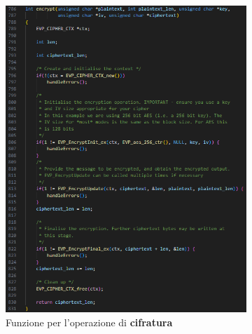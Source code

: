 \begin{figure}[h]
    \begin{subfigure}{0.49\textwidth}
        \includegraphics[width=1\textwidth]{capitoli/figure-implementazione/aes-encrypt.png}
        \caption{Funzione per l'operazione di \textbf{cifratura}}
        \label{fig:aes-encrypt}
    \end{subfigure}
    \begin{subfigure}{0.49\textwidth}

\end{subfigure}
\end{figure}
